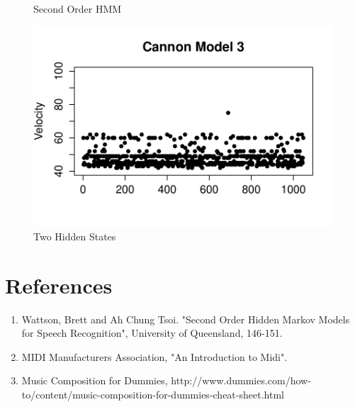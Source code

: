 \documentclass{article} %
\begin{document}
\begin{figure}[ht]
\begin{minipage}[b]{0.5\linewidth}
    \caption{Second Order HMM} 
    \vspace{4ex}
  \end{minipage}%
  \begin{minipage}[b]{0.5\linewidth}
    \centering
    \includegraphics[scale = 0.45]{CannonModel3Velocity.pdf} 
    \caption{Two Hidden States} 
    \vspace{4ex}
  \end{minipage} 
\end{figure}

\newpage

\section{References}
\begin{enumerate}
\item Wattson, Brett and Ah Chung Tsoi. "Second Order Hidden Markov Models for Speech Recognition", University of Queensland, 146-151. 
\item MIDI Manufacturers Association, "An Introduction to Midi". 
\item Music Composition for Dummies, http://www.dummies.com/how-to/content/music-composition-for-dummies-cheat-sheet.html
\end{enumerate}
\end{document}
